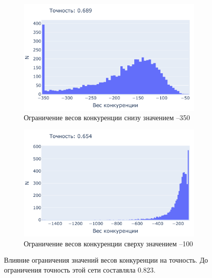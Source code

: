 \documentclass[a4paper]{article}
\begin{document}
\begin{figure}[H]
\centering

\begin{subfigure}{0.45\textwidth}
    \includegraphics[width=\textwidth,keepaspectratio=true]{competition_distribution_clamp_low_ru.pdf}
    \caption{Ограничение весов конкуренции снизу значением --350} 
\end{subfigure}
\begin{subfigure}{0.45\textwidth}
    \includegraphics[width=\textwidth,keepaspectratio=true]{competition_distribution_clamp_high_ru.pdf}
    \caption{Ограничение весов конкуренции сверху значением --100}
\end{subfigure} 
\caption{Влияние ограничения значений весов конкуренции на точность. До ограничения точность этой сети составляла 0.823.}
\end{figure}
\end{document}
